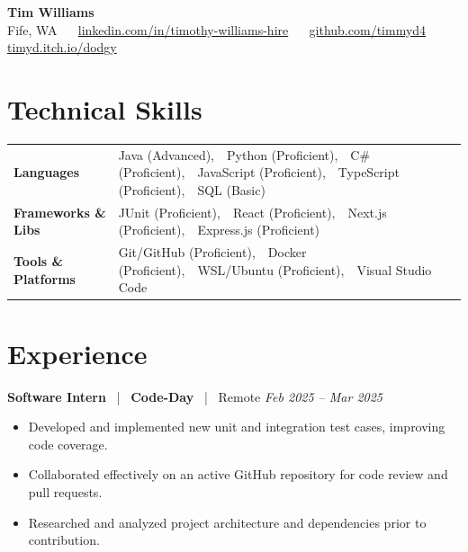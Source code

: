 \documentclass[10pt, letterpaper]{article}
\newcommand{\jobhead}[4]{%
  \vspace{5pt}%
  {\bfseries\color{dark}#1}%
  ~{\color{light}|}~%
  {\bfseries\color{navy}#2}%
  ~{\color{light}|}~%
  {\color{light}#3}%
  \hfill{\color{light}\small\textit{#4}}\\[-2pt]%
}
\newcommand{\skillrow}[2]{%
  {\bfseries #1} & #2 \\[2pt]%
}
\begin{document}

\begin{center}
  {\huge\bfseries\color{navy} Tim Williams}\\[4pt]
  {\small\color{light}
    Fife, WA
    ~\textbullet~
    \href{https://linkedin.com/in/timothy-williams-hire}{linkedin.com/in/timothy-williams-hire}
    ~\textbullet~
    \href{https://github.com/timmyd4}{github.com/timmyd4}
    ~\textbullet~
    \href{https://timyd.itch.io/dodgy}{timyd.itch.io/dodgy}
  }
\end{center}

\vspace{2pt}

\section{Technical Skills}

\begin{tabular}{@{}p{1.6in} p{5.2in}@{}}
  \skillrow{Languages}{Java (Advanced),\ \ Python (Proficient),\ \ C\# (Proficient),\ \ JavaScript (Proficient),\ \ TypeScript (Proficient),\ \ SQL (Basic)}
  \skillrow{Frameworks \& Libs}{JUnit (Proficient),\ \ React (Proficient),\ \ Next.js (Proficient),\ \ Express.js (Proficient)}
  \skillrow{Tools \& Platforms}{Git/GitHub (Proficient),\ \ Docker (Proficient),\ \ WSL/Ubuntu (Proficient),\ \ Visual Studio Code}
\end{tabular}

\section{Experience}

\jobhead{Software Intern}{Code-Day}{Remote}{Feb 2025 – Mar 2025}
\begin{itemize}
  \item Developed and implemented new unit and integration test cases, improving code coverage.
  \item Collaborated effectively on an active GitHub repository for code review and pull requests.
  \item Researched and analyzed project architecture and dependencies prior to contribution.
\end{itemize}
\end{document}
